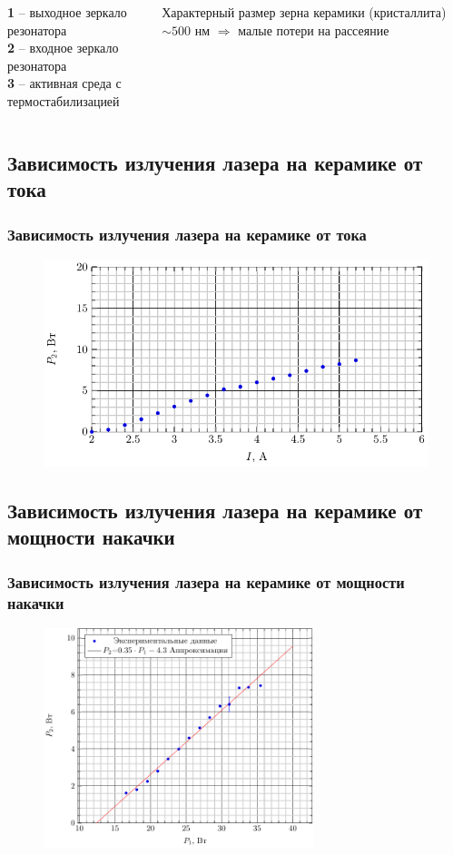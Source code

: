 \documentclass[10pt,pdf,hyperref={unicode}, dvipsnames]{beamer}
\newcommand\frametitless[1]{\subsection{#1}\frametitle{#1}}
\begin{document}
\begin{frame}[t]
	\begin{columns}
		\begin{column}{0.6\textwidth}
			\textbf{1} -- выходное зеркало резонатора \\
			\textbf{2} -- входное зеркало резонатора \\
			\textbf{3} -- активная среда с термостабилизацией
		\end{column}
		\begin{column}{0.4\textwidth}
			Характерный размер зерна керамики (кристаллита) $\sim 500$ нм $\Rightarrow$ малые потери на рассеяние
		\end{column}
	\end{columns}	
\end{frame}
\begin{frame}[t]
	\frametitless{Зависимость излучения лазера на керамике от тока}
		\begin{figure}[tb]
		\centering
		\includegraphics[]{img/P2I2}
	\end{figure}
\end{frame}
\begin{frame}[t]
	\frametitless{Зависимость излучения лазера на керамике от мощности накачки}
		\begin{figure}[tb]
		\centering
		\includegraphics[width=0.7\textwidth]{img/P2P}
	\end{figure}
\end{frame}
\end{document}
